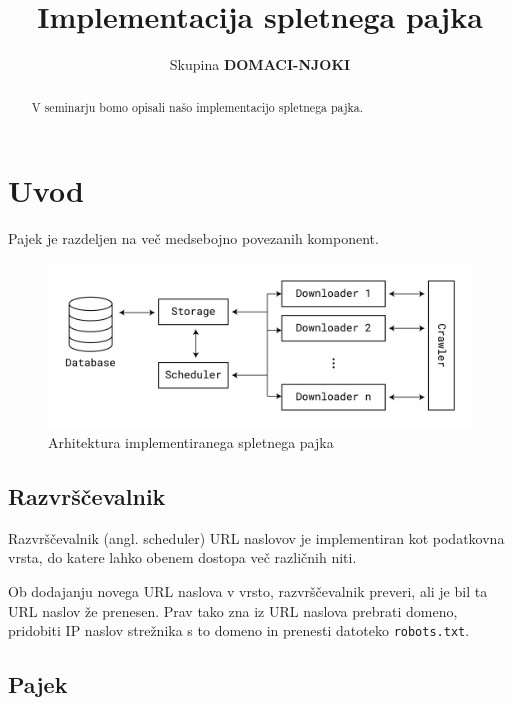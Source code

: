 \documentclass[conference]{IEEEtran}
\begin{document}
	
	\title{Implementacija spletnega pajka}
	
	\author{Skupina \textbf{DOMACI-NJOKI}}
	
	\maketitle
	
	\begin{abstract}
		V seminarju bomo opisali našo implementacijo spletnega pajka.
	\end{abstract}
	
	\IEEEpeerreviewmaketitle
	
	\section{Uvod}
	
	Pajek je razdeljen na več medsebojno povezanih komponent.
	
	\begin{figure}[h]
		\centering
		\includegraphics[width=.9\linewidth]{images/arhitecture}
		\caption{Arhitektura implementiranega spletnega pajka}
	\end{figure}

	\subsection{Razvrščevalnik}

	Razvrščevalnik (angl. scheduler) URL naslovov je implementiran kot podatkovna vrsta, do katere lahko obenem dostopa več različnih niti. 
	
	Ob dodajanju novega URL naslova v vrsto, razvrščevalnik preveri, ali je bil ta URL naslov že prenesen. Prav tako zna iz URL naslova prebrati domeno, pridobiti IP naslov strežnika s to domeno in prenesti datoteko \texttt{robots.txt}.
	
	\subsection{Pajek}
	
\end{document}
